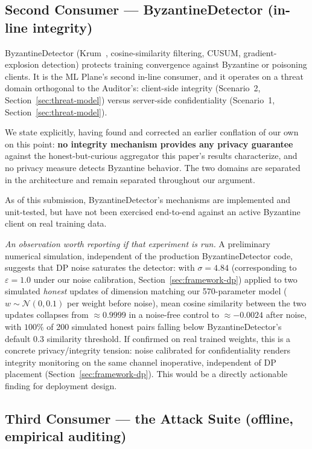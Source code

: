 \subsection{Second Consumer --- ByzantineDetector (in-line integrity)}
\label{sec:framework-byzantine}

ByzantineDetector (Krum~\cite{blanchard2017machine},
cosine-similarity filtering, CUSUM, gradient-explosion detection)
protects training convergence against Byzantine or poisoning clients.
It is the ML Plane's second in-line consumer, and it operates on a
threat domain orthogonal to the Auditor's: client-side integrity
(Scenario~2, Section~\ref{sec:threat-model}) versus server-side
confidentiality (Scenario~1, Section~\ref{sec:threat-model}).

We state explicitly, having found and corrected an earlier conflation
of our own on this point: \textbf{no integrity mechanism provides any
privacy guarantee} against the honest-but-curious aggregator this
paper's results characterize, and no privacy measure detects Byzantine
behavior. The two domains are separated in the architecture and remain
separated throughout our argument.

As of this submission, ByzantineDetector's mechanisms are implemented
and unit-tested, but have not been exercised end-to-end against an
active Byzantine client on real training data.

\emph{An observation worth reporting if that experiment is run.} A
preliminary numerical simulation, independent of the production
ByzantineDetector code, suggests that DP noise saturates the detector:
with $\sigma = 4.84$ (corresponding to $\varepsilon = 1.0$ under our
noise calibration, Section~\ref{sec:framework-dp}) applied to two
simulated \emph{honest} updates of dimension matching our
570-parameter model ($w \sim \mathcal{N}(0, 0.1)$ per weight before
noise), mean cosine similarity between the two updates collapses from
$\approx 0.9999$ in a noise-free control to $\approx -0.0024$ after
noise, with $100\%$ of 200 simulated honest pairs falling below
ByzantineDetector's default $0.3$ similarity threshold. If confirmed on
real trained weights, this is a concrete privacy/integrity tension:
noise calibrated for confidentiality renders integrity monitoring on
the same channel inoperative, independent of DP placement
(Section~\ref{sec:framework-dp}). This would be a directly actionable
finding for deployment design.

\subsection{Third Consumer --- the Attack Suite (offline, empirical auditing)}
\label{sec:framework-attacks}

